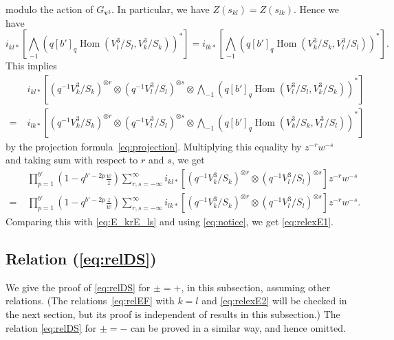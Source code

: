 \documentclass[12pt]{amsart}
\theoremstyle{definition}
\theoremstyle{remark}
\numberwithin{equation}{subsection}
\newcommand{\Hom}{\operatorname{Hom}}
\newcommand{\bv}{{\mathbf v}} %
\newcommand{\Wedge}{{\textstyle \bigwedge}}
\begin{document}
modulo the action of $G_{\bv^3}$. In particular, we have
$Z(s_{kl}) = Z(s_{lk})$.
Hence we have
\begin{equation*}
   i_{kl*}\left[
     \Wedge_{-1} (q [b']_q \Hom(V^3_l/S_l, V^3_k/S_k))^*\right]
  = i_{lk*}\left[
     \Wedge_{-1} (q [b']_q \Hom(V^3_k/S_k, V^3_l/S_l))^*\right].
\end{equation*}
%
This implies
\begin{equation}
\begin{split}
    & i_{kl*}\left[(q^{-1}V^3_k/S_k)^{\otimes r} \otimes
      (q^{-1} V^3_l/S_l)^{\otimes s} \otimes
    \Wedge_{-1} (q [b']_q \Hom(V^3_l/S_l, V^3_k/S_k))^*\right] \\
  =\; & i_{lk*}\left[(q^{-1}V^3_k/S_k)^{\otimes r} \otimes
        (q^{-1}V^3_l/S_l)^{\otimes s} \otimes
    \Wedge_{-1} (q [b']_q \Hom(V^3_k/S_k, V^3_l/S_l))^*\right]
\end{split}
\end{equation}
by the projection formula~\eqref{eq:projection}.
Multiplying this equality by $z^{-r} w^{-s}$ and taking sum with
respect to $r$ and $s$, we get
\begin{equation*}
\begin{split}
   & \prod_{p=1}^{b'} (1 - q^{b'-2p}\frac{w}{z})
   \sum_{r,s=-\infty}^\infty
    i_{kl*}\left[(q^{-1}V^3_k/S_k)^{\otimes r} \otimes
      (q^{-1} V^3_l/S_l)^{\otimes s}\right] z^{-r} w^{-s}\\
  =\; & \prod_{p=1}^{b'} (1 - q^{b'-2p}\frac{z}{w})
   \sum_{r,s=-\infty}^\infty
    i_{lk*}\left[(q^{-1}V^3_k/S_k)^{\otimes r}\otimes
      (q^{-1} V^3_l/S_l)^{\otimes s}\right] z^{-r} w^{-s}.
\end{split}
\end{equation*}
Comparing this with \eqref{eq:E_krE_ls} and using \eqref{eq:notice},
we get \eqref{eq:relexE1}.

\subsection{Relation (\ref{eq:relDS})}
We give the proof of \eqref{eq:relDS} for $\pm = +$, in this
subsection, assuming other relations.
%
(The relations~\eqref{eq:relEF} with $k = l$ and \eqref{eq:relexE2}
will be checked in the next section, but its proof is independent of
results in this subsection.)
%
The relation \eqref{eq:relDS}
for $\pm = -$ can be proved in a similar way, and hence omitted.
\end{document}
